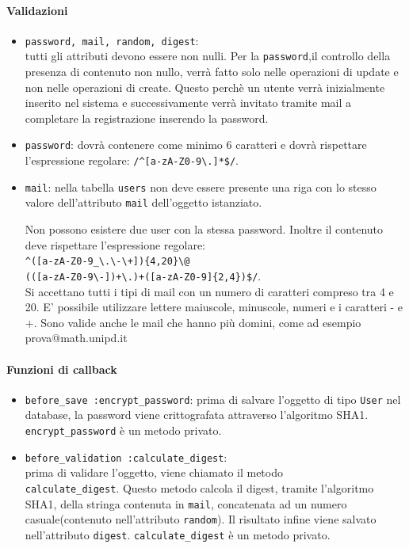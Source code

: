 \documentclass[11pt,a4paper]{article}
\begin{document}
\paragraph{Validazioni}
\begin{itemize}
\item \verb|password, mail, random, digest|:\\tutti gli attributi devono essere non nulli. Per la \verb|password|,il controllo della presenza di contenuto non nullo, verrà fatto solo nelle operazioni di update e non nelle operazioni di create. Questo perchè un utente verrà inizialmente inserito nel sistema e successivamente verrà invitato tramite mail a completare la registrazione inserendo la password. 
\item \verb|password|: dovrà contenere come minimo 6 caratteri e dovrà rispettare l'espressione regolare: \verb|/^[a-zA-Z0-9\.]*$/|. 
 \item \verb|mail|: nella tabella \verb|users| non deve essere presente una riga con lo stesso valore dell'attributo \verb|mail| dell'oggetto istanziato. 

Non possono esistere due user con la stessa password. Inoltre il contenuto deve rispettare l'espressione regolare:\\
\verb|^([a-zA-Z0-9_\.\-\+]){4,20}\@|\\ \verb|(([a-zA-Z0-9\-])+\.)+([a-zA-Z0-9]{2,4})$/|.\\
Si accettano tutti i tipi di mail con un numero di caratteri compreso tra 4 e 20. E' possibile utilizzare lettere maiuscole, minuscole, numeri e i caratteri - e +.
Sono valide anche le mail che hanno più domini, come ad esempio prova@math.unipd.it  
\end{itemize}
\paragraph{Funzioni di callback}
\begin{itemize}
 \item \verb|before_save :encrypt_password|: prima di salvare l'oggetto di tipo \verb|User| nel database, la password viene crittografata attraverso l'algoritmo SHA1. \verb|encrypt_password| è un metodo privato.
\item \verb|before_validation :calculate_digest|:\\
 prima di validare l'oggetto, viene chiamato il metodo\\ \verb|calculate_digest|. Questo metodo calcola il digest, tramite l'algoritmo SHA1, della stringa contenuta in \verb|mail|, concatenata ad un numero casuale(contenuto nell'attributo \verb|random|). Il risultato infine viene salvato nell'attributo \verb|digest|. \verb|calculate_digest| è un metodo privato.
\end{itemize}
\end{document}
